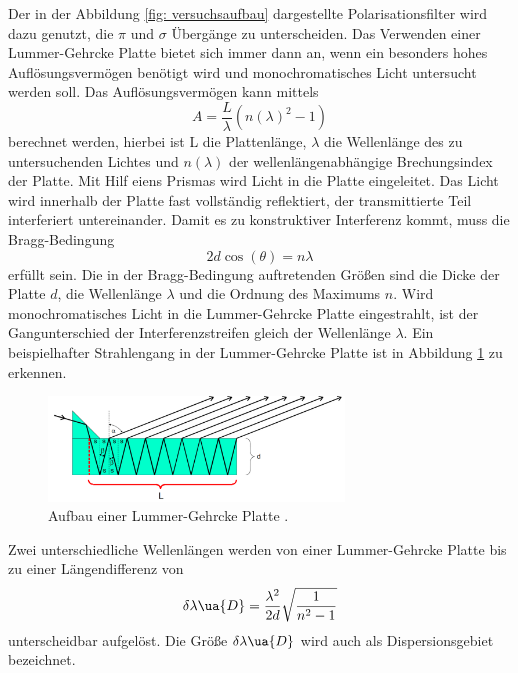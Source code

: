 Der in der Abbildung \ref{fig: versuchsaufbau} dargestellte Polarisationsfilter wird dazu genutzt, %
die $\pi$ und $\sigma$ Übergänge zu unterscheiden. Das Verwenden einer Lummer-Gehrcke Platte
bietet sich immer dann an, wenn ein besonders hohes Auflösungsvermögen benötigt wird
und monochromatisches Licht untersucht werden soll.
Das Auflösungsvermögen kann mittels
\begin{equation}
  \label{eq: auflösungsvermoegen_lummer}
  A=\frac{L}{\lambda}(n(\lambda)^2-1)
\end{equation}
berechnet werden, hierbei ist L die Plattenlänge, $\lambda$ die Wellenlänge
des zu untersuchenden Lichtes und $n(\lambda)$ der wellenlängenabhängige
Brechungsindex der Platte. Mit Hilf eiens Prismas wird Licht in die Platte eingeleitet. %
Das Licht wird innerhalb der Platte fast vollständig reflektiert, der transmittierte
Teil interferiert untereinander. Damit es zu konstruktiver Interferenz kommt, muss die Bragg-Bedingung %
\begin{equation*}
  2d\cos(\theta)=n\lambda
\end{equation*}
erfüllt sein. Die in der Bragg-Bedingung auftretenden Größen sind die Dicke der Platte $d$,
die Wellenlänge $\lambda$ und die Ordnung des Maximums $n$. %
Wird monochromatisches Licht in die Lummer-Gehrcke Platte eingestrahlt, ist der
Gangunterschied der Interferenzstreifen gleich der Wellenlänge $\lambda$.
Ein beispielhafter Strahlengang in der Lummer-Gehrcke Platte ist in Abbildung \ref{fig: lummer} zu erkennen.
\FloatBarrier
\begin{figure}[h]
  \centering
  \includegraphics[width=0.7\textwidth]{pics/lummer.png}
  \caption{Aufbau einer Lummer-Gehrcke Platte \cite{anleitung27}.}
  \label{fig: lummer}
\end{figure}
\FloatBarrier
Zwei unterschiedliche Wellenlängen werden von einer Lummer-Gehrcke Platte bis zu
einer Längendifferenz von
\begin{equation}
  \label{eq: lummer_wellendif}
  \delta \lambda\ua{D}=\frac{\lambda^2}{2 d} \sqrt{\frac{1}{n^2-1}}
\end{equation}
unterscheidbar aufgelöst. Die Größe $\delta \lambda\ua{D}$ wird auch als Dispersionsgebiet
bezeichnet.

